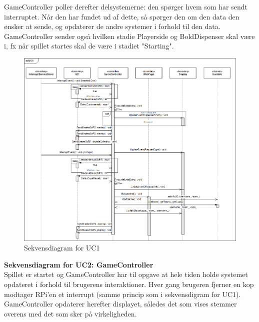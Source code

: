 \documentclass[Arkitektur/System_main.tex]{subfiles}
\begin{document}
GameController poller derefter delsystemerne: den spørger hvem som har sendt interruptet. Når den har fundet ud af dette, så spørger den om den data den ønsker at sende, og opdaterer de andre systemer i forhold til den data. 
\\GameController sender også hvilken stadie Playerside og BoldDispenser skal være i, fx når spillet startes skal de være i stadiet "Starting". 

\begin{figure}[H]
    \centering
    \includegraphics[width=\textwidth]{Arkitektur/Softwarearkitektur/Applikationsmodel/RPi/graphics_RPi/UC1_SD.png}
    \caption{Sekvensdiagram for UC1}
    \label{fig:UC1_SD_RPi}
\end{figure}

\textbf{Sekvensdiagram for UC2: GameController}\\
Spillet er startet og GameController har til opgave at hele tiden holde systemet opdateret i forhold til brugerens interaktioner. Hver gang brugeren fjerner en kop modtager RPi'en et interrupt (samme princip som i sekvensdigram for UC1). GameController opdaterer herefter displayet, således det som vises stemmer overens med det som sker på virkeligheden. 
\end{document}
